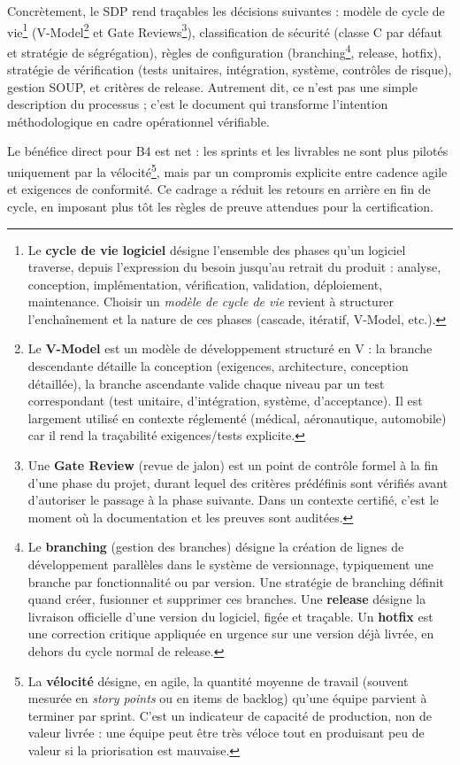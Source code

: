 Concrètement, le SDP rend traçables les décisions suivantes : modèle de cycle de vie\footnote{Le \textbf{cycle de vie logiciel} d\'esigne l'ensemble des phases qu'un logiciel traverse, depuis l'expression du besoin jusqu'au retrait du produit : analyse, conception, impl\'ementation, v\'erification, validation, d\'eploiement, maintenance. Choisir un \emph{mod\`ele de cycle de vie} revient \`a structurer l'encha\^inement et la nature de ces phases (cascade, it\'eratif, V-Model, etc.).} (V-Model\footnote{Le \textbf{V-Model} est un mod\`ele de d\'eveloppement structur\'e en V : la branche descendante d\'etaille la conception (exigences, architecture, conception d\'etaill\'ee), la branche ascendante valide chaque niveau par un test correspondant (test unitaire, d'int\'egration, syst\`eme, d'acceptance). Il est largement utilis\'e en contexte r\'eglement\'e (m\'edical, a\'eronautique, automobile) car il rend la tra\c{c}abilit\'e exigences/tests explicite.\label{fn:vmodel}} et Gate Reviews\footnote{Une \textbf{Gate Review} (revue de jalon) est un point de contr\^ole formel \`a la fin d'une phase du projet, durant lequel des crit\`eres pr\'ed\'efinis sont v\'erifi\'es avant d'autoriser le passage \`a la phase suivante. Dans un contexte certifi\'e, c'est le moment o\`u la documentation et les preuves sont audit\'ees.}), classification de sécurité (classe C par défaut et stratégie de ségrégation), règles de configuration (branching\footnote{Le \textbf{branching} (gestion des branches) d\'esigne la cr\'eation de lignes de d\'eveloppement parall\`eles dans le syst\`eme de versionnage, typiquement une branche par fonctionnalit\'e ou par version. Une strat\'egie de branching d\'efinit quand cr\'eer, fusionner et supprimer ces branches. Une \textbf{release} d\'esigne la livraison officielle d'une version du logiciel, fig\'ee et tra\c{c}able. Un \textbf{hotfix} est une correction critique appliqu\'ee en urgence sur une version d\'ej\`a livr\'ee, en dehors du cycle normal de release.}, release, hotfix), stratégie de vérification (tests unitaires, intégration, système, contrôles de risque), gestion SOUP, et critères de release. Autrement dit, ce n'est pas une simple description du processus ; c'est le document qui transforme l'intention méthodologique en cadre opérationnel vérifiable.

Le bénéfice direct pour B4 est net : les sprints et les livrables ne sont plus pilotés uniquement par la vélocité\footnote{La \textbf{v\'elocit\'e} d\'esigne, en agile, la quantit\'e moyenne de travail (souvent mesur\'ee en \emph{story points} ou en items de backlog) qu'une \'equipe parvient \`a terminer par sprint. C'est un indicateur de capacit\'e de production, non de valeur livr\'ee : une \'equipe peut \^etre tr\`es v\'eloce tout en produisant peu de valeur si la priorisation est mauvaise.}, mais par un compromis explicite entre cadence agile et exigences de conformité. Ce cadrage a réduit les retours en arrière en fin de cycle, en imposant plus tôt les règles de preuve attendues pour la certification.


